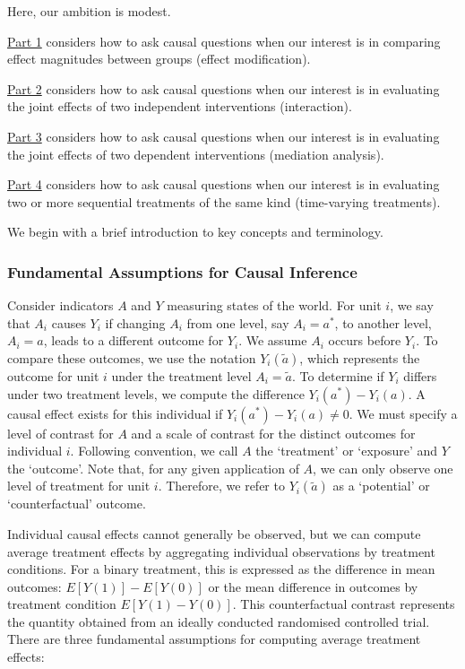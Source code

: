 \documentclass[
  single column]{article}
\begin{document}
Here, our ambition is modest.

\hyperref[id-sec-1]{Part 1} considers how to ask causal questions when
our interest is in comparing effect magnitudes between groups (effect
modification).

\hyperref[id-sec-2]{Part 2} considers how to ask causal questions when
our interest is in evaluating the joint effects of two independent
interventions (interaction).

\hyperref[id-sec-3]{Part 3} considers how to ask causal questions when
our interest is in evaluating the joint effects of two dependent
interventions (mediation analysis).

\hyperref[id-sec-4]{Part 4} considers how to ask causal questions when
our interest is in evaluating two or more sequential treatments of the
same kind (time-varying treatments).

We begin with a brief introduction to key concepts and terminology.

\subsubsection{Fundamental Assumptions for Causal
Inference}\label{fundamental-assumptions-for-causal-inference}

Consider indicators \(A\) and \(Y\) measuring states of the world. For
unit \(i\), we say that \(A_i\) causes \(Y_i\) if changing \(A_i\) from
one level, say \(A_i = a^*\), to another level, \(A_i = a\), leads to a
different outcome for \(Y_i\). We assume \(A_i\) occurs before \(Y_i\).
To compare these outcomes, we use the notation \(Y_i(\tilde{a})\), which
represents the outcome for unit \(i\) under the treatment level
\(A_i = \tilde{a}\). To determine if \(Y_i\) differs under two treatment
levels, we compute the difference \(Y_i(a^*) - Y_i(a)\). A causal effect
exists for this individual if \(Y_i(a^*) - Y_i(a) \neq 0\). We must
specify a level of contrast for \(A\) and a scale of contrast for the
distinct outcomes for individual \(i\). Following convention, we call
\(A\) the `treatment' or `exposure' and \(Y\) the `outcome'. Note that,
for any given application of \(A\), we can only observe one level of
treatment for unit \(i\). Therefore, we refer to \(Y_i(\tilde{a})\) as a
`potential' or `counterfactual' outcome.

Individual causal effects cannot generally be observed, but we can
compute average treatment effects by aggregating individual observations
by treatment conditions. For a binary treatment, this is expressed as
the difference in mean outcomes: \(E[Y(1)] - E[Y(0)]\) or the mean
difference in outcomes by treatment condition \(E[Y(1) - Y(0)]\). This
counterfactual contrast represents the quantity obtained from an ideally
conducted randomised controlled trial. There are three fundamental
assumptions for computing average treatment effects:
\end{document}
